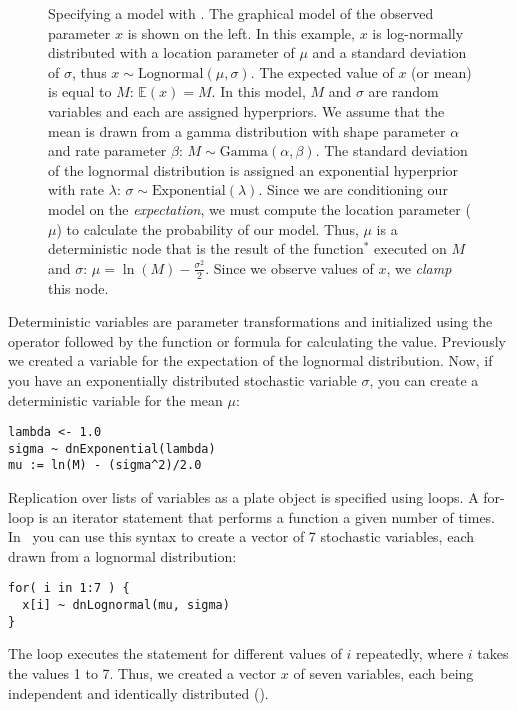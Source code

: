 \begin{figure}[h!]
\centering
{}
\caption{\small Specifying a model with \Rev. 
The graphical model of the observed parameter $x$ is shown on the left. 
In this example, $x$ is log-normally distributed with a location parameter of $\mu$ and a standard deviation of $\sigma$, thus $x \sim \mbox{Lognormal}(\mu, \sigma)$. 
The expected value of $x$ (or mean) is equal to $M$: $\mathbb{E}(x) = M$. 
In this model, $M$ and $\sigma$ are random variables and each are assigned hyperpriors. 
We assume that the mean is drawn from a gamma distribution with shape parameter $\alpha$ and rate parameter $\beta$: $M \sim \mbox{Gamma}(\alpha, \beta)$. 
The standard deviation of the lognormal distribution is assigned an exponential hyperprior with rate $\lambda$: $\sigma \sim \mbox{Exponential}(\lambda)$. 
Since we are conditioning our model on the \emph{expectation}, we must compute the location parameter ($\mu$) to 
calculate the probability of our model. 
Thus, $\mu$ is a deterministic node that is the result of the function$^*$ executed on $M$ and $\sigma$: $\mu = \ln(M) - \frac{\sigma^2}{2}$. 
Since we observe values of $x$, we \emph{clamp} this node.
}
\label{revgmexample}
\end{figure}

Deterministic variables are parameter transformations and initialized using the \cl{:=} operator followed by the function or formula for calculating the value. 
Previously we created a variable for the expectation of the lognormal distribution.
Now, if you have an exponentially distributed stochastic variable $\sigma$, you can create a deterministic variable for the mean $\mu$:
{\tt \begin{snugshade*}
\begin{lstlisting}
lambda <- 1.0
sigma ~ dnExponential(lambda)
mu := ln(M) - (sigma^2)/2.0
\end{lstlisting}
\end{snugshade*}}

Replication over lists of variables as a plate object is specified using  loops. 
A for-loop is an iterator statement that performs a function a given number of times. 
In \Rev~you can use this syntax to create a vector of 7 stochastic variables, each drawn from a lognormal distribution:
{\tt \begin{snugshade*}
\begin{lstlisting}
for( i in 1:7 ) {
  x[i] ~ dnLognormal(mu, sigma)
}
\end{lstlisting}
\end{snugshade*}}
The  loop executes the statement  for different values of $i$ repeatedly, where $i$ takes the values 1 to 7.
Thus, we created a vector $x$ of seven variables, each being independent and identically distributed (\IID).


